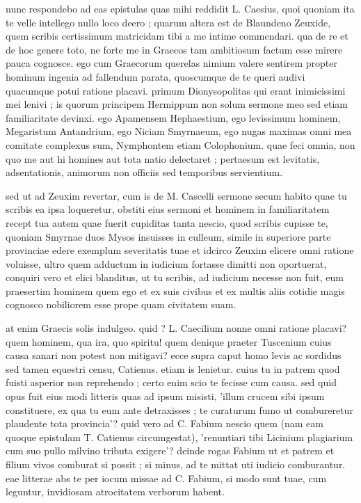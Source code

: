  nunc respondebo ad eas epistulas quas mihi reddidit L. Caesius, quoi quoniam ita te velle intellego nullo loco deero ; quarum altera est de Blaundeno Zeuxide, quem scribis certissimum matricidam tibi a me intime commendari. qua de re et de hoc genere toto, ne forte me in Graecos tam ambitiosum factum esse mirere pauca cognosce. ego cum Graecorum querelas nimium valere sentirem propter hominum ingenia ad fallendum parata, quoscumque de te queri audivi quacumque potui ratione placavi. primum Dionysopolitas qui erant inimicissimi mei lenivi ; is quorum principem Hermippum non solum sermone meo sed etiam familiaritate devinxi. ego Apamensem Hephaestium, ego levissimum hominem, Megaristum Antandrium, ego Niciam Smyrnaeum, ego nugas maximas omni mea comitate complexus sum, Nymphontem etiam Colophonium. quae feci omnia, non quo me aut hi homines aut tota natio delectaret ; pertaesum est levitatis, adsentationis, animorum non officiis sed temporibus servientium.

 sed ut ad Zeuxim revertar, cum is de M. Cascelli sermone secum habito quae tu scribis ea ipsa loqueretur, obstiti eius sermoni et hominem in familiaritatem recept tua autem quae fuerit cupiditas tanta nescio, quod scribis cupisse te, quoniam Smyrnae duos Mysos insuisses in culleum, simile in superiore parte provinciae edere exemplum severitatis tuae et idcirco Zeuxim elicere omni ratione voluisse, ultro quem adductum in iudicium fortasse dimitti non oportuerat, conquiri vero et elici blanditus, ut tu scribis, ad iudicium necesse non fuit, eum praesertim hominem quem ego et ex suis civibus et ex multis aliis cotidie magis cognosco nobiliorem esse prope quam civitatem suam.

 at enim Graecis solis indulgeo. quid ? L. Caecilium nonne omni ratione placavi? quem hominem, qua ira, quo spiritu! quem denique praeter Tuscenium cuius causa sanari non potest non mitigavi? ecce supra caput homo levis ac sordidus sed tamen equestri censu, Catienus. etiam is lenietur. cuius tu in patrem quod fuisti asperior non reprehendo ; certo enim scio te fecisse cum causa. sed quid opus fuit eius modi litteris quas ad ipsum misisti, 'illum crucem sibi ipsum constituere, ex qua tu eum ante detraxisses ; te curaturum fumo ut combureretur plaudente tota provincia'? quid vero ad C. Fabium nescio quem (nam eam quoque epistulam T. Catienus circumgestat), 'renuntiari tibi Licinium plagiarium cum suo pullo milvino tributa exigere'? deinde rogas Fabium ut et patrem et filium vivos comburat si possit ; si minus, ad te mittat uti iudicio comburantur. eae litterae abs te per iocum missae ad C. Fabium, si modo sunt tuae, cum leguntur, invidiosam atrocitatem verborum habent.

